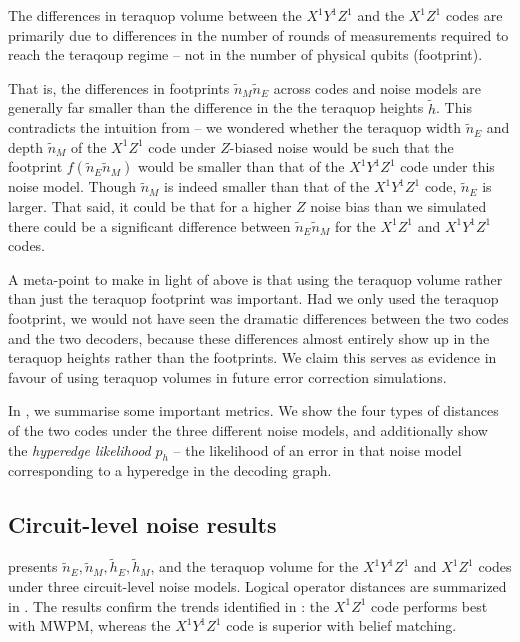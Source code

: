 \begin{keypoint}\label{key:XYZ_XZ_footprints_similar}
The differences in teraquop volume between the $X^1 Y^1 Z^1$ and the $X^1 Z^1$ codes are primarily due to differences in the number of rounds of measurements required to reach the teraqoup regime -- not in the number of physical qubits (footprint).

\end{keypoint}

That is, the differences in footprints $\tilde{n}_M \tilde{n}_E$ across codes and noise models are generally far smaller than the difference in the the teraquop heights $\tilde{h}$.
This contradicts the intuition from  -- we wondered whether the teraquop width $\tilde{n}_E$ and depth $\tilde{n}_M$ of the $X^1 Z^1$ code under $Z$-biased noise would be such that the footprint $f(\tilde{n}_E \tilde{n}_M)$ would be smaller than that of the $X^1 Y^1 Z^1$ code under this noise model.
Though $\tilde{n}_M$ is indeed smaller than that of the $X^1 Y^1 Z^1$ code, $\tilde{n}_E$ is larger.
That said, it could be that for a higher $Z$ noise bias than we simulated there could be a significant difference between $\tilde{n}_E \tilde{n}_M$ for the $X^1Z^1$ and $X^1Y^1Z^1$ codes.

A meta-point to make in light of  above is that using the teraquop volume rather than just the teraquop footprint was important.
Had we only used the teraquop footprint, we would not have seen the dramatic differences between the two codes and the two decoders, because these differences almost entirely show up in the teraquop heights rather than the footprints.
We claim this serves as evidence in favour of using teraquop volumes in future error correction simulations.

In , we summarise some important metrics.
We show the four types of distances of the two codes under the three different noise models,
and additionally show the \textit{hyperedge likelihood} $p_h$ -- the likelihood of an error in that noise model corresponding to a hyperedge in the decoding graph.


\subsection{Circuit-level noise results}\label{subsec:unrepeated-circuit-level-noise}

 presents $\tilde{n}_E, \tilde{n}_M, \tilde{h}_E, \tilde{h}_M$, and the teraquop volume for the $X^1Y^1Z^1$ and $X^1Z^1$ codes under three circuit-level noise models.
Logical operator distances are summarized in .
The results confirm the trends identified in : the $X^1Z^1$ code performs best with MWPM, whereas the $X^1Y^1Z^1$ code is superior with belief matching.

